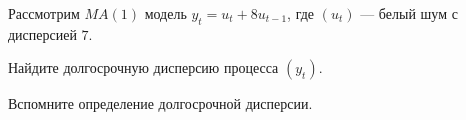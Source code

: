 
\begin{question}
Рассмотрим \(MA(1)\) модель \(y_t = u_t + 8 u_{t-1}\),
где \((u_t)\) --- белый шум с дисперсией \(7\).

Найдите долгосрочную дисперсию процесса \((y_t)\).
\end{question}

\begin{solution}
Вспомните определение долгосрочной дисперсии.
\end{solution}

